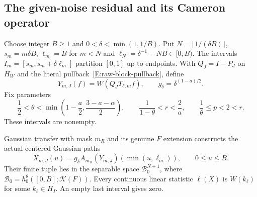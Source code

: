 \subsection{The given-noise residual and its Cameron operator}

Choose integer $B\ge1$ and $0<\delta<\min(1,1/B)$.
Put $N=\lfloor1/(\delta B)\rfloor$, $s_m=m\delta B$,
$\ell_m=B$ for $m<N$ and $\ell_N=\delta^{-1}-NB\in[0,B)$.
The intervals $I_m=[s_m,s_m+\delta\ell_m]$ partition $[0,1]$
up to endpoints. With $Q_J=I-P_J$ on $H_W$ and the literal
pullback~\eqref{E:raw-block-pullback}, define
\[
  Y_{m,J}(f)=W(Q_JT_{\delta,m}f),\qquad
  g_\delta=\delta^{(1-a)/2}.
\]
Fix parameters
\begin{equation}\label{E:cameron-block-parameters}
  \frac12<\theta<\min\left(1-\frac a2,\frac{3-a-\alpha}{2}\right),
  \qquad \frac1{1-\theta}<r<\frac2a,\qquad
  \frac1\theta\le p<2<r .
\end{equation}
These intervals are nonempty.

\begin{lemma}
  \label{L:cameron-actual-residual}
  Gaussian transfer with mask $m_R$ and its genuine $F$ extension
  constructs the actual centered Gaussian paths
  \[
    X_{m,J}(u)=g_\delta A_{m_R}(Y_{m,J})(\min(u,\ell_m)),
    \qquad 0\le u\le B.
  \]
  Their finite tuple lies in the separable space
  $\mathscr B_0^{N+1}$, where
  $\mathscr B_0=h_0^\theta([0,B];\mathcal K(F))$.
  Every continuous linear statistic $\ell(X)$ is $W(k_\ell)$
  for some $k_\ell\in H_I$. An empty last interval gives zero.
\end{lemma}

